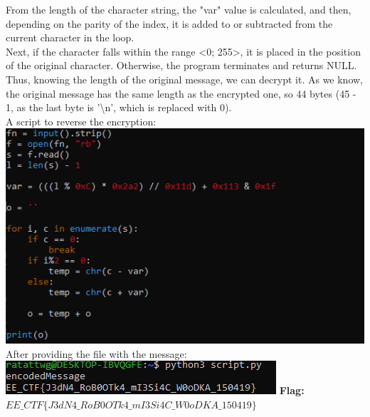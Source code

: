 \documentclass{article}
\begin{document}
From the length of the character string, the "var" value is calculated, and then, depending on the parity of the index, it is added to or subtracted from the current character in the loop.
\vspace{3mm} \\
Next, if the character falls within the range <0; 255>, it is placed in the position of the original character. Otherwise, the program terminates and returns NULL.
\vspace{3mm} \\
Thus, knowing the length of the original message, we can decrypt it.
As we know, the original message has the same length as the encrypted one, so 44 bytes (45 - 1, as the last byte is '\textbackslash n', which is replaced with 0).
\vspace{3mm} \\
A script to reverse the encryption: \\
\includegraphics[width=\textwidth]{"image78.png"}
After providing the file with the message:
\vspace{3mm} \\
\includegraphics[width=\textwidth]{"image79.png"}
\vspace{3mm}
\textbf{Flag:} $ EE\_CTF\{J3dN4\_RoB0OTk4\_mI3Si4C\_W0oDKA\_150419\} $

\newpage
\end{document}

